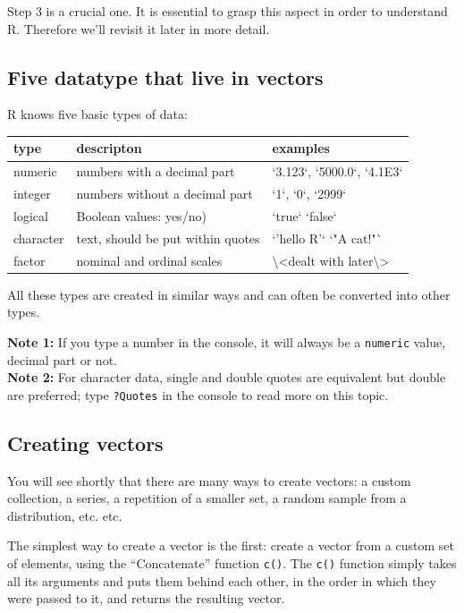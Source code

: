 \documentclass[]{book}
\begin{document}
Step 3 is a crucial one. It is essential to grasp this aspect in order to understand R. Therefore we'll revisit it later in more detail.

\hypertarget{five-datatype-that-live-in-vectors}{%
\subsection{Five datatype that live in vectors}\label{five-datatype-that-live-in-vectors}}

R knows five basic types of data:

\begin{tabular}{l|l|l}
\hline
type & descripton & examples\\
\hline
numeric & numbers with a decimal part & `3.123`, `5000.0`, `4.1E3`\\
\hline
integer & numbers without a decimal part & `1`, `0`, `2999`\\
\hline
logical & Boolean values: yes/no) & `true` `false`\\
\hline
character & text, should be put within quotes & `'hello R'` `"A cat!"`\\
\hline
factor & nominal and ordinal scales & \textbackslash{}<dealt with later\textbackslash{}>\\
\hline
\end{tabular}

All these types are created in similar ways and can often be converted into other types.

\textbf{Note 1:} If you type a number in the console, it will always be a \texttt{numeric} value, decimal part or not.\\
\textbf{Note 2:} For character data, single and double quotes are equivalent but double are preferred; type \texttt{?Quotes} in the console to read more on this topic.

\hypertarget{creating-vectors}{%
\subsection{Creating vectors}\label{creating-vectors}}

You will see shortly that there are many ways to create vectors: a custom collection, a series, a repetition of a smaller set, a random sample from a distribution, etc. etc.

The simplest way to create a vector is the first: create a vector from a custom set of elements, using the ``Concatenate'' function \texttt{c()}. The \texttt{c()} function simply takes all its arguments and puts them behind each other, in the order in which they were passed to it, and returns the resulting vector.
\end{document}
